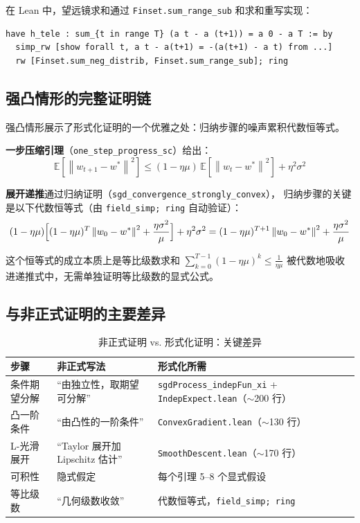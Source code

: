 \documentclass[12pt, a4paper]{article}
\newcommand{\E}{\mathbb{E}}
\newcommand{\norm}[1]{\left\| #1 \right\|}
\newcommand{\wstar}{w^*}
\newcommand{\lean}[1]{\texttt{#1}}
\begin{document}
在 Lean 中，望远镜求和通过 \lean{Finset.sum\_range\_sub} 和求和重写实现：
\begin{lstlisting}
have h_tele : sum_{t in range T} (a t - a (t+1)) = a 0 - a T := by
  simp_rw [show forall t, a t - a(t+1) = -(a(t+1) - a t) from ...]
  rw [Finset.sum_neg_distrib, Finset.sum_range_sub]; ring
\end{lstlisting}

\subsection{强凸情形的完整证明链}

强凸情形展示了形式化证明的一个优雅之处：归纳步骤的噪声累积代数恒等式。

\textbf{一步压缩引理}（\lean{one\_step\_progress\_sc}）给出：
\[
  \E[\norm{w_{t+1} - \wstar}^2] \leq (1 - \eta\mu)\,\E[\norm{w_t - \wstar}^2] + \eta^2\sigma^2
\]

\textbf{展开递推}通过归纳证明（\lean{sgd\_convergence\_strongly\_convex}），
归纳步骤的关键是以下代数恒等式（由 \lean{field\_simp; ring} 自动验证）：
\[
  (1-\eta\mu)\Bigl[(1-\eta\mu)^T \norm{w_0 - \wstar}^2 + \frac{\eta\sigma^2}{\mu}\Bigr]
  + \eta^2\sigma^2
  = (1-\eta\mu)^{T+1}\norm{w_0 - \wstar}^2 + \frac{\eta\sigma^2}{\mu}
\]

这个恒等式的成立本质上是等比级数求和 $\sum_{k=0}^{T-1}(1-\eta\mu)^k \leq \frac{1}{\eta\mu}$
被代数地吸收进递推式中，无需单独证明等比级数的显式公式。

\subsection{与非正式证明的主要差异}

\begin{table}[H]
\centering
\caption{非正式证明 vs. 形式化证明：关键差异}
\begin{tabular}{p{3.5cm}p{4cm}p{5cm}}
\toprule
\textbf{步骤} & \textbf{非正式写法} & \textbf{形式化所需} \\
\midrule
条件期望分解 & ``由独立性，取期望可分解'' & \lean{sgdProcess\_indepFun\_xi} + \lean{IndepExpect.lean}（$\sim$200 行） \\
凸一阶条件 & ``由凸性的一阶条件'' & \lean{ConvexGradient.lean}（$\sim$130 行） \\
L-光滑展开 & ``Taylor 展开加 Lipschitz 估计'' & \lean{SmoothDescent.lean}（$\sim$170 行） \\
可积性 & 隐式假定 & 每个引理 5--8 个显式假设 \\
等比级数 & ``几何级数收敛'' & 代数恒等式，\lean{field\_simp; ring} \\
\bottomrule
\end{tabular}
\end{table}
\end{document}
